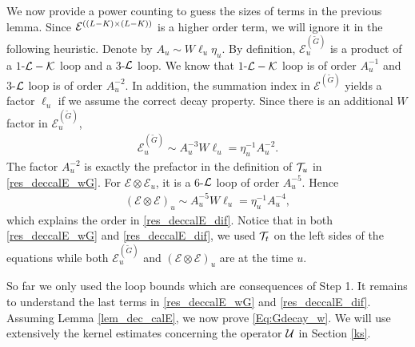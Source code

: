 \documentclass[10pt,reqno]{article}
\theoremstyle{plain} %
\theoremstyle{remark}
\numberwithin{equation}{section}
\begin{document}
We now provide a power counting to guess the sizes of terms in the previous lemma. Since 
$ {\cal E}^{( (L-K)\times(L-K) )}$ is a higher order term, we will ignore it in the following heuristic. 
Denote by $A_u \sim  W\ell_u\eta_u$. By definition, $\mathcal{E}^{( \widetilde{G} )}_u$ is a product of a $1$-$\cal L-\cal K$ loop and 
a $3$-$\cal L$ loop. We know that  $1$-$\cal L -\cal K$ loop is of order $A_u^{-1}$ and $3$-$\cal L$ loop is of order $A_u^{-2}$. In addition, 
the  summation index in $\mathcal{E}^{( \widetilde{G} )}$ yields a factor $\ell_u$ if we assume the correct decay property. Since there is an additional $W$ factor in $\mathcal{E}^{( \widetilde{G} )}_u$, 
\begin{align}
\mathcal{E}^{( \widetilde{G} )}_u \sim A_u^{-3} W \ell_u = \eta_u^{-1} A_u^{-2}.
\end{align}
The factor $A_u^{-2}$ is exactly the prefactor  in the definition of $ {\cal T}_u$ in \eqref{res_deccalE_wG}.  For $ \mathcal{E}\otimes  \mathcal{E}_u $, it is a $6$-$\cal L$ loop of order $A_u^{-5}$. Hence 
\begin{align}
(\mathcal{E}\otimes  \mathcal{E})_u \sim A_u^{-5} W \ell_u = \eta_u^{-1} A_u^{-4}, 
\end{align}
which explains the order in \eqref{res_deccalE_dif}.  Notice that in both \eqref{res_deccalE_wG} and  \eqref{res_deccalE_dif}, 
we used $ {\cal T}_t$ on the left sides of the equations while both $\mathcal{E}^{( \widetilde{G} )}_u$ and $(\mathcal{E}\otimes  \mathcal{E})_u$ are at the time $u$. 

So far we only used the loop bounds which are consequences of Step 1. 
It remains to understand the last terms in \eqref{res_deccalE_wG} and  \eqref{res_deccalE_dif}. Assuming  Lemma \ref{lem_dec_calE}, we now  prove  \eqref{Eq:Gdecay_w}. We will use extensively the kernel estimates concerning  the operator $\cal U$ in Section \ref{ks}. 
\end{document}
